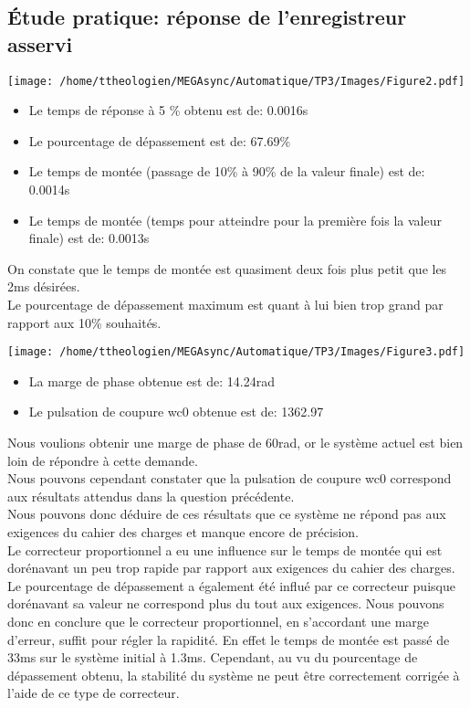 \documentclass[a4paper,12pt]{article}
\begin{document}
		\subsection{Étude pratique: réponse de l'enregistreur asservi}
			\begin{center}
				\texttt{[image: /home/ttheologien/MEGAsync/Automatique/TP3/Images/Figure2.pdf]}
			\end{center}
			\begin{itemize}
				\item Le temps de réponse à 5 \% obtenu est de: 0.0016s
				\item Le pourcentage de dépassement est de: 67.69\%
				\item Le temps de montée (passage de 10\% à 90\% de la valeur finale) est de: 0.0014s
				\item Le temps de montée (temps pour atteindre pour la première fois la valeur finale) est de: 0.0013s
			\end{itemize}
			On constate que le temps de montée est quasiment deux fois plus petit que les 2ms désirées. \\
			Le pourcentage de dépassement maximum est quant à lui bien trop grand par rapport aux 10\% souhaités. 
			\begin{center}
				\texttt{[image: /home/ttheologien/MEGAsync/Automatique/TP3/Images/Figure3.pdf]}
			\end{center}
			\begin{itemize}
				\item La marge de phase obtenue est de: 14.24rad
				\item Le pulsation de coupure wc0 obtenue est de: 1362.97
			\end{itemize}
			Nous voulions obtenir une marge de phase de 60rad, or le système actuel est bien loin de répondre à cette demande. \\
			Nous pouvons cependant constater que la pulsation de coupure wc0 correspond aux résultats attendus dans la question précédente. \\
			Nous pouvons donc déduire de ces résultats que ce système ne répond pas aux exigences du cahier des charges et manque encore de précision.\\
			Le correcteur proportionnel a eu une influence sur le temps de montée qui est dorénavant un peu trop rapide par rapport aux exigences du cahier des charges. Le pourcentage de dépassement a également été influé par ce correcteur puisque dorénavant sa valeur ne correspond plus du tout aux exigences. Nous pouvons donc en conclure que le correcteur proportionnel, en s'accordant une marge d'erreur, suffit pour régler la rapidité. En effet le temps de montée est passé de 33ms sur le système initial à 1.3ms. Cependant, au vu du pourcentage de dépassement obtenu, la stabilité du système ne peut être correctement corrigée à l'aide de ce type de correcteur.
			\newpage
\end{document}
